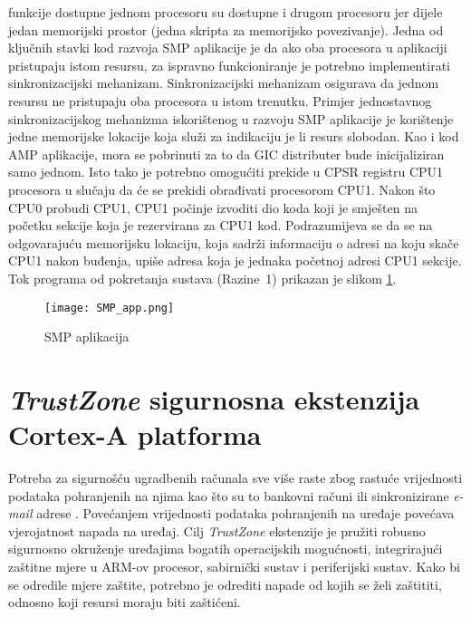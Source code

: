 \documentclass[times, utf8, diplomski, numeric]{fer}
\begin{document}
funkcije dostupne jednom procesoru su dostupne i drugom procesoru jer dijele jedan memorijski prostor (jedna skripta za
memorijsko povezivanje). Jedna od ključnih stavki kod razvoja SMP aplikacije je da ako oba procesora u aplikaciji pristupaju
istom resursu, za ispravno funkcioniranje je potrebno implementirati sinkronizacijski mehanizam. Sinkronizacijski mehanizam
osigurava da jednom resursu ne pristupaju oba procesora u istom trenutku. Primjer jednostavnog sinkronizacijskog mehanizma
iskorištenog u razvoju SMP aplikacije je korištenje jedne memorijske lokacije koja služi za indikaciju je li resurs slobodan.
Kao i kod AMP aplikacije, mora se pobrinuti za to da GIC distributer bude inicijaliziran samo jednom. Isto tako je potrebno
omogućiti prekide u CPSR registru CPU1 procesora u slučaju da će se prekidi obrađivati procesorom CPU1. Nakon što CPU0
probudi CPU1, CPU1 počinje izvoditi dio koda koji je smješten na početku sekcije koja je rezervirana za CPU1 kod.
Podrazumijeva se da se na odgovarajuću memorijsku lokaciju, koja sadrži informaciju o adresi na koju skače CPU1 nakon buđenja,
upiše adresa koja je jednaka početnoj adresi CPU1 sekcije. Tok programa od pokretanja sustava (Razine~1) prikazan je slikom
\ref{smp_app}.
\begin{figure}[H]
  \centering
	\texttt{[image: SMP\_app.png]}%
	\caption{SMP aplikacija}
	\label{smp_app}%
\end{figure}

\chapter{\textit{TrustZone} sigurnosna ekstenzija Cortex-A platforma}
Potreba za sigurnošću ugradbenih računala sve više raste zbog rastuće vrijednosti podataka pohranjenih na njima kao
što su to bankovni računi ili sinkronizirane \textit{e-mail} adrese \cite{tz_wp}. Povećanjem vrijednosti podataka pohranjenih na
uređaje povećava vjerojatnost napada na uređaj. Cilj \textit{TrustZone} ekstenzije je pružiti robusno sigurnosno okruženje
uređajima bogatih operacijskih mogućnosti, integrirajući zaštitne mjere u ARM-ov procesor, sabirnički sustav i periferijski
sustav. Kako bi se odredile mjere zaštite, potrebno je odrediti napade od kojih se želi zaštititi, odnosno koji resursi
moraju biti zaštićeni.
\end{document}
